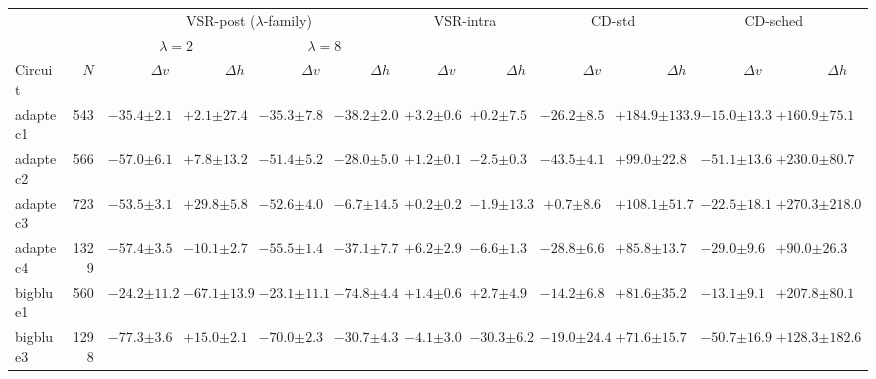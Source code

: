 \begin{tabular}{lrrrrrrrrrrrr}
\toprule
 & & \multicolumn{4}{c}{VSR-post ($\lambda$-family)} & \multicolumn{2}{c}{VSR-intra} & \multicolumn{2}{c}{CD-std} & \multicolumn{2}{c}{CD-sched} \\
\cmidrule(lr){3-6} \cmidrule(lr){7-8} \cmidrule(lr){9-10} \cmidrule(lr){11-12}
 & & \multicolumn{2}{c}{$\lambda=2$} & \multicolumn{2}{c}{$\lambda=8$} & & & & & & \\
Circuit & $N$ & $\Delta v$ & $\Delta h$ & $\Delta v$ & $\Delta h$ & $\Delta v$ & $\Delta h$ & $\Delta v$ & $\Delta h$ & $\Delta v$ & $\Delta h$ \\
\midrule
adaptec1 & 543 & $-35.4{\scriptscriptstyle\pm2.1}$ & $+2.1{\scriptscriptstyle\pm27.4}$ & $-35.3{\scriptscriptstyle\pm7.8}$ & $-38.2{\scriptscriptstyle\pm2.0}$ & $+3.2{\scriptscriptstyle\pm0.6}$ & $+0.2{\scriptscriptstyle\pm7.5}$ & $-26.2{\scriptscriptstyle\pm8.5}$ & $+184.9{\scriptscriptstyle\pm133.9}$ & $-15.0{\scriptscriptstyle\pm13.3}$ & $+160.9{\scriptscriptstyle\pm75.1}$ \\
adaptec2 & 566 & $-57.0{\scriptscriptstyle\pm6.1}$ & $+7.8{\scriptscriptstyle\pm13.2}$ & $-51.4{\scriptscriptstyle\pm5.2}$ & $-28.0{\scriptscriptstyle\pm5.0}$ & $+1.2{\scriptscriptstyle\pm0.1}$ & $-2.5{\scriptscriptstyle\pm0.3}$ & $-43.5{\scriptscriptstyle\pm4.1}$ & $+99.0{\scriptscriptstyle\pm22.8}$ & $-51.1{\scriptscriptstyle\pm13.6}$ & $+230.0{\scriptscriptstyle\pm80.7}$ \\
adaptec3 & 723 & $-53.5{\scriptscriptstyle\pm3.1}$ & $+29.8{\scriptscriptstyle\pm5.8}$ & $-52.6{\scriptscriptstyle\pm4.0}$ & $-6.7{\scriptscriptstyle\pm14.5}$ & $+0.2{\scriptscriptstyle\pm0.2}$ & $-1.9{\scriptscriptstyle\pm13.3}$ & $+0.7{\scriptscriptstyle\pm8.6}$ & $+108.1{\scriptscriptstyle\pm51.7}$ & $-22.5{\scriptscriptstyle\pm18.1}$ & $+270.3{\scriptscriptstyle\pm218.0}$ \\
adaptec4 & 1329 & $-57.4{\scriptscriptstyle\pm3.5}$ & $-10.1{\scriptscriptstyle\pm2.7}$ & $-55.5{\scriptscriptstyle\pm1.4}$ & $-37.1{\scriptscriptstyle\pm7.7}$ & $+6.2{\scriptscriptstyle\pm2.9}$ & $-6.6{\scriptscriptstyle\pm1.3}$ & $-28.8{\scriptscriptstyle\pm6.6}$ & $+85.8{\scriptscriptstyle\pm13.7}$ & $-29.0{\scriptscriptstyle\pm9.6}$ & $+90.0{\scriptscriptstyle\pm26.3}$ \\
bigblue1 & 560 & $-24.2{\scriptscriptstyle\pm11.2}$ & $-67.1{\scriptscriptstyle\pm13.9}$ & $-23.1{\scriptscriptstyle\pm11.1}$ & $-74.8{\scriptscriptstyle\pm4.4}$ & $+1.4{\scriptscriptstyle\pm0.6}$ & $+2.7{\scriptscriptstyle\pm4.9}$ & $-14.2{\scriptscriptstyle\pm6.8}$ & $+81.6{\scriptscriptstyle\pm35.2}$ & $-13.1{\scriptscriptstyle\pm9.1}$ & $+207.8{\scriptscriptstyle\pm80.1}$ \\
bigblue3 & 1298 & $-77.3{\scriptscriptstyle\pm3.6}$ & $+15.0{\scriptscriptstyle\pm2.1}$ & $-70.0{\scriptscriptstyle\pm2.3}$ & $-30.7{\scriptscriptstyle\pm4.3}$ & $-4.1{\scriptscriptstyle\pm3.0}$ & $-30.3{\scriptscriptstyle\pm6.2}$ & $-19.0{\scriptscriptstyle\pm24.4}$ & $+71.6{\scriptscriptstyle\pm15.7}$ & $-50.7{\scriptscriptstyle\pm16.9}$ & $+128.3{\scriptscriptstyle\pm182.6}$ \\
\bottomrule
\end{tabular}
